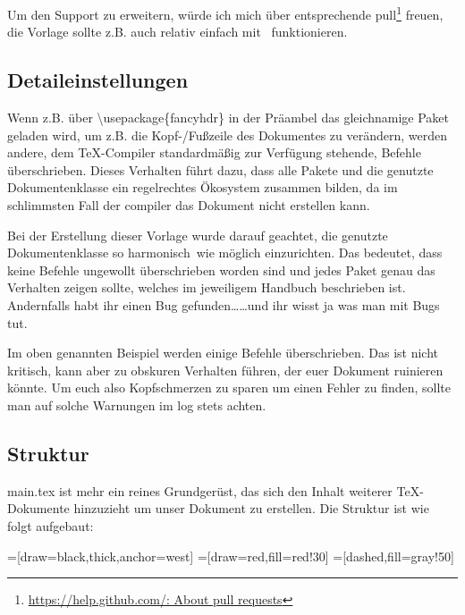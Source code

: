 Um den Support zu erweitern, würde ich mich über entsprechende \gls{pull}\footnote{\href{https://help.github.com/en/articles/about-pull-requests}{https://help.github.com/: About pull requests}} freuen, die Vorlage sollte z.B. auch relativ einfach mit \ funktionieren.

\subsection{Detaileinstellungen}
\label{detail-grundl}
Wenn z.B. über \textbackslash usepackage\{fancyhdr\} in der Präambel das gleichnamige Paket geladen wird, um z.B. die Kopf-/Fußzeile des Dokumentes zu verändern, werden andere, dem \TeX{}-Compiler standardmäßig zur Verfügung stehende, Befehle überschrieben. Dieses Verhalten führt dazu, dass alle Pakete und die genutzte Dokumentenklasse ein regelrechtes Ökosystem zusammen bilden, da im schlimmsten Fall der \gls{compiler} das Dokument nicht erstellen kann.

Bei der Erstellung dieser Vorlage wurde darauf geachtet, die genutzte Dokumentenklasse so \glqq harmonisch\grqq\ wie möglich einzurichten. Das bedeutet, dass keine Befehle ungewollt überschrieben worden sind und jedes Paket genau das Verhalten zeigen sollte, welches im jeweiligem Handbuch beschrieben ist. Andernfalls habt ihr einen Bug gefunden\dots \dots und ihr wisst ja was man mit Bugs tut.

Im oben genannten Beispiel werden einige Befehle überschrieben. Das ist nicht kritisch, kann aber zu obskuren Verhalten führen, der euer Dokument ruinieren könnte. Um euch also Kopfschmerzen zu sparen um einen Fehler zu finden, sollte man auf solche Warnungen im log stets achten.

\subsection{Struktur}
main.tex ist mehr ein reines Grundgerüst, das sich den Inhalt weiterer \TeX{}-Dokumente hinzuzieht um unser Dokument zu erstellen. Die Struktur ist wie folgt aufgebaut:

=[draw=black,thick,anchor=west]
=[draw=red,fill=red!30]
=[dashed,fill=gray!50]

